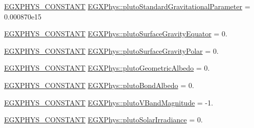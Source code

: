 \begin{DoxyCompactItemize}
\item 
\mbox{\hyperlink{group___e_g_x_phys-_constants-_macros_ga76980d288494ce1714c9ac68a95ba702}{E\+G\+X\+P\+H\+Y\+S\+\_\+\+C\+O\+N\+S\+T\+A\+NT}} \mbox{\hyperlink{group___e_g_x_phys-_constants-_astrophysics-_solar_system-_pluto-_bulk_gade5772f124606cf8e1603f344f4faf22}{E\+G\+X\+Phys\+::pluto\+Standard\+Gravitational\+Parameter}} = 0.\+000870e15
\item 
\mbox{\hyperlink{group___e_g_x_phys-_constants-_macros_ga76980d288494ce1714c9ac68a95ba702}{E\+G\+X\+P\+H\+Y\+S\+\_\+\+C\+O\+N\+S\+T\+A\+NT}} \mbox{\hyperlink{group___e_g_x_phys-_constants-_astrophysics-_solar_system-_pluto-_bulk_gaf00d2f0cf5a243cab208536f6d7f50ee}{E\+G\+X\+Phys\+::pluto\+Surface\+Gravity\+Equator}} = 0.
\item 
\mbox{\hyperlink{group___e_g_x_phys-_constants-_macros_ga76980d288494ce1714c9ac68a95ba702}{E\+G\+X\+P\+H\+Y\+S\+\_\+\+C\+O\+N\+S\+T\+A\+NT}} \mbox{\hyperlink{group___e_g_x_phys-_constants-_astrophysics-_solar_system-_pluto-_bulk_gae694708582fa89671ec90cf232dc314e}{E\+G\+X\+Phys\+::pluto\+Surface\+Gravity\+Polar}} = 0.
\item 
\mbox{\hyperlink{group___e_g_x_phys-_constants-_macros_ga76980d288494ce1714c9ac68a95ba702}{E\+G\+X\+P\+H\+Y\+S\+\_\+\+C\+O\+N\+S\+T\+A\+NT}} \mbox{\hyperlink{group___e_g_x_phys-_constants-_astrophysics-_solar_system-_pluto-_bulk_ga8d3aa3bc7e6cd541e2b12538d3e55918}{E\+G\+X\+Phys\+::pluto\+Geometric\+Albedo}} = 0.
\item 
\mbox{\hyperlink{group___e_g_x_phys-_constants-_macros_ga76980d288494ce1714c9ac68a95ba702}{E\+G\+X\+P\+H\+Y\+S\+\_\+\+C\+O\+N\+S\+T\+A\+NT}} \mbox{\hyperlink{group___e_g_x_phys-_constants-_astrophysics-_solar_system-_pluto-_bulk_gab0bb375e06a6bae85b474d6629f87f57}{E\+G\+X\+Phys\+::pluto\+Bond\+Albedo}} = 0.
\item 
\mbox{\hyperlink{group___e_g_x_phys-_constants-_macros_ga76980d288494ce1714c9ac68a95ba702}{E\+G\+X\+P\+H\+Y\+S\+\_\+\+C\+O\+N\+S\+T\+A\+NT}} \mbox{\hyperlink{group___e_g_x_phys-_constants-_astrophysics-_solar_system-_pluto-_bulk_gaed84c83982a2343b562c9c7f82b81aa2}{E\+G\+X\+Phys\+::pluto\+V\+Band\+Magnitude}} = -\/1.
\item 
\mbox{\hyperlink{group___e_g_x_phys-_constants-_macros_ga76980d288494ce1714c9ac68a95ba702}{E\+G\+X\+P\+H\+Y\+S\+\_\+\+C\+O\+N\+S\+T\+A\+NT}} \mbox{\hyperlink{group___e_g_x_phys-_constants-_astrophysics-_solar_system-_pluto-_bulk_ga44054a6e7228949e0e7bee426de56400}{E\+G\+X\+Phys\+::pluto\+Solar\+Irradiance}} = 0.
\end{DoxyCompactItemize}


